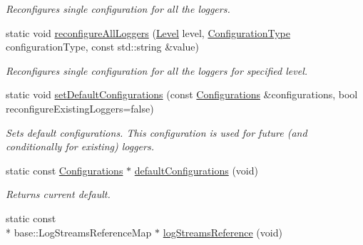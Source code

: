 \begin{DoxyCompactItemize}
\begin{DoxyCompactList}\small\item\em Reconfigures single configuration for all the loggers. \end{DoxyCompactList}\item 
\hypertarget{classel_1_1Loggers_ab24b99e5bb3c907d1418ee3266f15397}{static void \hyperlink{classel_1_1Loggers_ab24b99e5bb3c907d1418ee3266f15397}{reconfigure\-All\-Loggers} (\hyperlink{namespaceel_ab0ac6091262344c52dd2d3ad099e8e36}{Level} level, \hyperlink{namespaceel_a281f5db6d6163678bc68a8b23b59e124}{Configuration\-Type} configuration\-Type, const std\-::string \&value)}\label{classel_1_1Loggers_ab24b99e5bb3c907d1418ee3266f15397}

\begin{DoxyCompactList}\small\item\em Reconfigures single configuration for all the loggers for specified level. \end{DoxyCompactList}\item 
\hypertarget{classel_1_1Loggers_ab9fb62a8ff904ff887fefde3282f46a4}{static void \hyperlink{classel_1_1Loggers_ab9fb62a8ff904ff887fefde3282f46a4}{set\-Default\-Configurations} (const \hyperlink{classel_1_1Configurations}{Configurations} \&configurations, bool reconfigure\-Existing\-Loggers=false)}\label{classel_1_1Loggers_ab9fb62a8ff904ff887fefde3282f46a4}

\begin{DoxyCompactList}\small\item\em Sets default configurations. This configuration is used for future (and conditionally for existing) loggers. \end{DoxyCompactList}\item 
\hypertarget{classel_1_1Loggers_a96f2336fafdc3ef2c4df01a73ae5ffb7}{static const \hyperlink{classel_1_1Configurations}{Configurations} $\ast$ \hyperlink{classel_1_1Loggers_a96f2336fafdc3ef2c4df01a73ae5ffb7}{default\-Configurations} (void)}\label{classel_1_1Loggers_a96f2336fafdc3ef2c4df01a73ae5ffb7}

\begin{DoxyCompactList}\small\item\em Returns current default. \end{DoxyCompactList}\item 
\hypertarget{classel_1_1Loggers_ad17312c9474d94bc98efcaf08ca279a4}{static const \\*
base\-::\-Log\-Streams\-Reference\-Map $\ast$ \hyperlink{classel_1_1Loggers_ad17312c9474d94bc98efcaf08ca279a4}{log\-Streams\-Reference} (void)}\label{classel_1_1Loggers_ad17312c9474d94bc98efcaf08ca279a4}


\end{DoxyCompactItemize}
